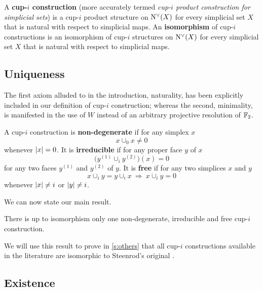 \begin{definition}
	A \textbf{\mbox{cup-$i$} construction} (more accurately termed \emph{\mbox{cup-$i$} product construction for simplicial sets}) is a \mbox{cup-$i$} product structure on $\operatorname{N^{\vee}}(X)$ for every simplicial set $X$ that is natural with respect to simplicial maps.
	An \textbf{isomorphism} of \mbox{cup-$i$} constructions is an isomorphism of \mbox{cup-$i$} structures on $\operatorname{N^{\vee}}(X)$ for every simplicial set $X$ that is natural with respect to simplicial maps.
\end{definition}

\subsection{Uniqueness}

The first axiom alluded to in the introduction, naturality, has been explicitly included in our definition of \mbox{cup-$i$} construction; whereas the second, minimality, is manifested in the use of $W$ instead of an arbitrary projective resolution of ${\mathbb{F}_2}$.

\begin{definition} \label{d:properties}
	A \mbox{cup-$i$} construction is \textbf{non-degenerate} if for any simplex $x$
	\[
	\boxed{x \cup_0 x \neq 0}
	\]
	whenever $\lvert x\rvert = 0$.
	It is \textbf{irreducible} if for any proper face $y$ of $x$
	\[
	\boxed{\Big( y^{(1)} \cup_{i} y^{(2)} \Big)(x) = 0}
	\]
	for any two faces $y^{(1)}$ and $y^{(2)}$ of $y$.
	It is \textbf{free} if for any two simplices $x$ and $y$
	\[
	\boxed{x \cup_{i} y = y \cup_{i} x} \
	\Longrightarrow \
	\boxed{x \cup_{i} y = 0}
	\]
	whenever $\lvert x\rvert \neq i$ or $\lvert y\rvert \neq i$.
\end{definition}

We can now state our main result.

\begin{theorem} \label{t:main}
	There is up to isomorphism only one non-degenerate, irreducible and free \mbox{cup-$i$} construction.
\end{theorem}

We will use this result to prove in \cref{s:others} that all \mbox{cup-$i$} constructions available in the literature are isomorphic to Steenrod's original \cite{steenrod1947products}.

\subsection{Existence}

